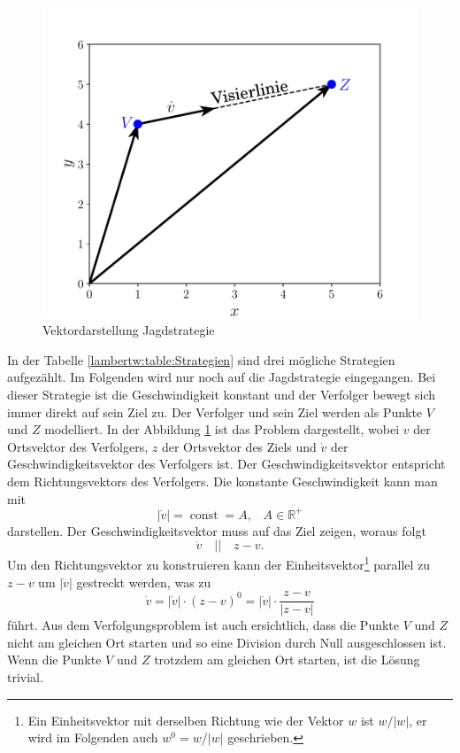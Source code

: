 \begin{figure}
    \centering
	\includegraphics[scale=0.6]{./papers/lambertw/Bilder/Strategie.pdf}
    \caption{Vektordarstellung Jagdstrategie}
    \label{lambertw:grafic:pursuerDGL2}
\end{figure}
%
In der Tabelle \ref{lambertw:table:Strategien} sind drei mögliche Strategien aufgezählt.
Im Folgenden wird nur noch auf die Jagdstrategie eingegangen.
Bei dieser Strategie ist die Geschwindigkeit konstant und der Verfolger bewegt sich immer direkt auf sein Ziel zu.
Der Verfolger und sein Ziel werden als Punkte $V$ und $Z$ modelliert.
In der Abbildung \ref{lambertw:grafic:pursuerDGL2} ist das Problem dargestellt,
wobei $v$ der Ortsvektor des Verfolgers, $z$ der Ortsvektor des Ziels und $\dot{v}$ der Geschwindigkeitsvektor des Verfolgers ist.
Der Geschwindigkeitsvektor entspricht dem Richtungsvektors des Verfolgers.
Die konstante Geschwindigkeit kann man mit
%
\begin{equation}
    |\dot{v}|
    = \operatorname{const} = A
    \text{,}\quad A\in\mathbb{R}^+
\end{equation}
%
darstellen. Der Geschwindigkeitsvektor muss auf das Ziel zeigen, woraus folgt
\begin{equation}
    \dot{v}
    \quad||\quad
    z-v
    \text{.}
\end{equation}
Um den Richtungsvektor zu konstruieren kann der Einheitsvektor\footnote{%
Ein Einheitsvektor mit derselben Richtung wie der Vektor $w$ ist
$w/|w|$, er wird im Folgenden auch $w^0=w/|w|$ geschrieben.}
parallel
zu $z-v$ um $|\dot{v}|$ gestreckt werden, was zu
\begin{equation}
    \dot{v}
    =
    |\dot{v}|\cdot (z-v)^0
    =
    |\dot{v}|\cdot\frac{z-v}{|z-v|}
    \label{lambertw:richtungsvektor}
\end{equation}
führt.
Aus dem Verfolgungsproblem ist auch ersichtlich, dass die Punkte $V$ und $Z$ nicht am gleichen Ort starten und so eine Division durch Null ausgeschlossen ist.
Wenn die Punkte $V$ und $Z$ trotzdem am gleichen Ort starten, ist die Lösung trivial.


